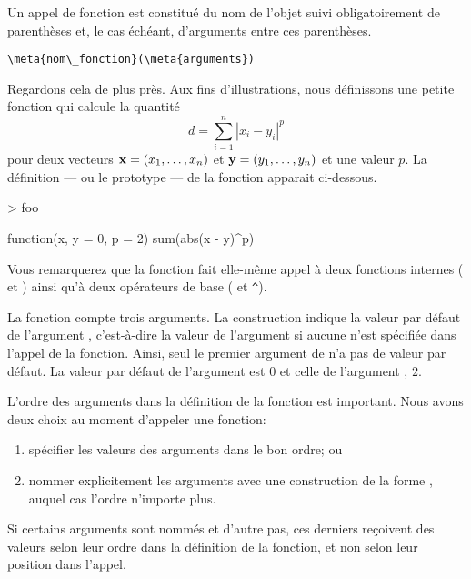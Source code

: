 Un appel de fonction est constitué du nom de
l'objet suivi obligatoirement de parenthèses \code{(~)} et, le cas
échéant, d'arguments entre ces parenthèses.
\begin{Schunk}
\begin{Verbatim}[commandchars=\\\{\}]
\meta{nom\_fonction}(\meta{arguments})
\end{Verbatim}
\end{Schunk}

Regardons cela de plus près. Aux fins d'illustrations, nous
définissons une petite fonction  qui calcule la quantité
\begin{equation*}
  d = \sum_{i = 1}^n |x_i - y_i|^p
\end{equation*}
pour deux vecteurs $\mathbf{x} = (x_1, \dots, x_n)$ et
$\mathbf{y} = (y_1, \dots, y_n)$ et une valeur $p$. La définition --- ou
le prototype --- de la fonction apparait ci-dessous.
\begin{Schunk}
\begin{Sinput}
> foo
\end{Sinput}
\begin{Soutput}
function(x, y = 0, p = 2) sum(abs(x - y)^p)
\end{Soutput}
\end{Schunk}

Vous remarquerez que la fonction fait elle-même appel à deux fonctions
internes ( et ) ainsi qu'à deux opérateurs de base
(\code{-} et \verb|^|).

La fonction compte trois arguments. La construction  indique la valeur par défaut de l'argument ,
c'est-à-dire la valeur de l'argument si aucune n'est spécifiée dans
l'appel de la fonction. Ainsi, seul le premier argument de 
n'a pas de valeur par défaut. La valeur par défaut de l'argument
 est $0$ et celle de l'argument , $2$.

L'ordre des arguments dans la définition de la fonction est important.
Nous avons deux choix au moment d'appeler une fonction:
\begin{enumerate}
\item spécifier les valeurs des arguments dans le bon ordre; ou
\item nommer explicitement les arguments avec une construction de la
  forme , auquel cas l'ordre n'importe
  plus.
\end{enumerate}
Si certains arguments sont nommés et d'autre pas, ces derniers
reçoivent des valeurs selon leur ordre dans la définition de la
fonction, et non selon leur position dans l'appel.


